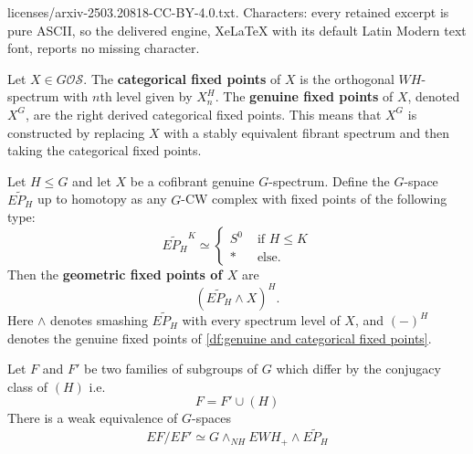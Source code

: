 \documentclass[10pt,a4paper]{amsart}
\newcommand{\Osp}{\mathcal{OS}}
\begin{document}
licenses/arxiv-2503.20818-CC-BY-4.0.txt. Characters: every retained excerpt is pure ASCII, so the delivered engine, XeLaTeX with its default Latin Modern text font, reports no missing character.
\begin{df}\label{df:genuine and categorical fixed points}
Let $X\in G\Osp$. The \textbf{categorical fixed points} of $X$ is the orthogonal $WH$-spectrum with $n$th level given by $X_n^H$. The \textbf{genuine fixed points} of $X$, denoted $X^G$, are the right derived categorical fixed points. This means that $X^G$ is constructed by replacing $X$ with a stably equivalent fibrant spectrum and then taking the categorical fixed points.
\end{df}

\begin{df}\label{df:geometric fixed points}
Let $H\leq G$ and let $X$ be a cofibrant genuine $G$-spectrum. Define the $G$-space $\widetilde{EP_H}$ up to homotopy as any $G$-CW complex with fixed points of the following type:
\[
\widetilde{EP_H}^K \simeq\begin{cases}
S^0 & \text{ if } H\leq K\\
* & \text{ else. }
\end{cases}
\]
Then the \textbf{geometric fixed points of $X$} are 
\[
(\widetilde{EP_H} \wedge X)^{H}.
\]
Here $\wedge$ denotes smashing $\widetilde{EP_H}$ with every spectrum level of $X$, and $(-)^H$ denotes the genuine fixed points of \cref{df:genuine and categorical fixed points}. 
\end{df}

\begin{lem}\label{lem:quotient space}
Let $F$ and $F'$ be two families of subgroups of $G$ which differ by the conjugacy class of $(H)$ i.e.
\[
F= F'\cup (H)
\]
There is a weak equivalence of $G$-spaces
\[
EF/EF' \simeq G\wedge_{NH} EWH_+ \wedge \widetilde{EP_H}
\]
\end{lem}
\end{document}
